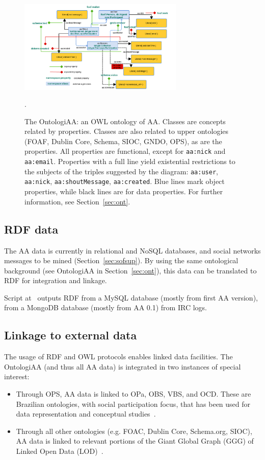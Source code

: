 \documentclass[12pt,fleqn]{article}
\begin{document}
\begin{figure}[!htbp] %
\vspace{-2pt}
\begin{center}
    \includegraphics[width=0.7\textwidth]{../imgs/ontologiaa_}
    \caption{The OntologiAA: an OWL ontology of AA. Classes are concepts related by properties.
	Classes are also related to upper ontologies (FOAF, Dublin Core, Schema, SIOC, GNDO, OPS), as are the properties.
	All properties are functional, except for {\tt aa:nick} and {\tt aa:email}.
	Properties with a full line yield existential restrictions to the subjects of the triples suggested by the diagram: 
	{\tt aa:user}, {\tt aa:nick}, {\tt aa:shoutMessage}, {\tt aa:created}.
	Blue lines mark object properties, while black lines are for data properties.
	For further information, see Section~\ref{sec:ont}.}.
    \label{fig:ontologiaa}
\end{center}
\end{figure}


\subsection{RDF data}
The AA data is currently in relational and NoSQL databases,
and social networks messages to be mined (Section~\ref{sec:sofsup}).
By using the same ontological background (see OntologiAA in Section~\ref{sec:ont}),
this data can be translated to RDF for integration and linkage.

Script at~\cite{participation} outputs RDF from a MySQL database (mostly from first AA version),
from a MongoDB database (mostly from AA 0.1)
from IRC logs.

\subsection{Linkage to external data}
The usage of RDF and OWL protocols enables linked data facilities.
The OntologiAA (and thus all AA data) is integrated in two instances of special interest:
\begin{itemize}
    \item Through OPS, AA data is linked to OPa, OBS, VBS, and OCD.
	    These are Brazilian ontologies,
		with social participation focus,
		that has been used for data representation and conceptual studies~\citep{pnud5}.
    \item Through all other ontologies (e.g. FOAC, Dublin Core, Schema.org, SIOC),
	    AA data is linked to relevant portions of the Giant Global Graph (GGG) of Linked Open Data (LOD)~\citep{LOD,losd}.
\end{itemize}
\end{document}
